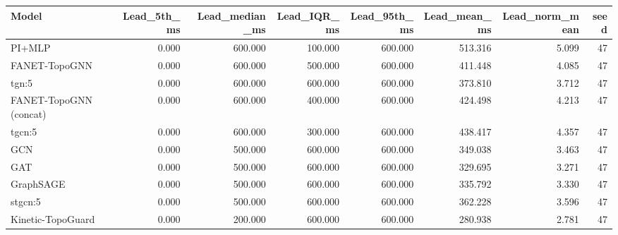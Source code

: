 \begin{tabular}{lrrrrrrr}
\toprule
Model & Lead\_5th\_ms & Lead\_median\_ms & Lead\_IQR\_ms & Lead\_95th\_ms & Lead\_mean\_ms & Lead\_norm\_mean & seed \\
\midrule
PI+MLP & 0.000 & 600.000 & 100.000 & 600.000 & 513.316 & 5.099 & 47 \\
FANET-TopoGNN & 0.000 & 600.000 & 500.000 & 600.000 & 411.448 & 4.085 & 47 \\
tgn:5 & 0.000 & 600.000 & 600.000 & 600.000 & 373.810 & 3.712 & 47 \\
FANET-TopoGNN (concat) & 0.000 & 600.000 & 400.000 & 600.000 & 424.498 & 4.213 & 47 \\
tgcn:5 & 0.000 & 600.000 & 300.000 & 600.000 & 438.417 & 4.357 & 47 \\
GCN & 0.000 & 500.000 & 600.000 & 600.000 & 349.038 & 3.463 & 47 \\
GAT & 0.000 & 500.000 & 600.000 & 600.000 & 329.695 & 3.271 & 47 \\
GraphSAGE & 0.000 & 500.000 & 600.000 & 600.000 & 335.792 & 3.330 & 47 \\
stgcn:5 & 0.000 & 500.000 & 600.000 & 600.000 & 362.228 & 3.596 & 47 \\
Kinetic-TopoGuard & 0.000 & 200.000 & 600.000 & 600.000 & 280.938 & 2.781 & 47 \\
\bottomrule
\end{tabular}
